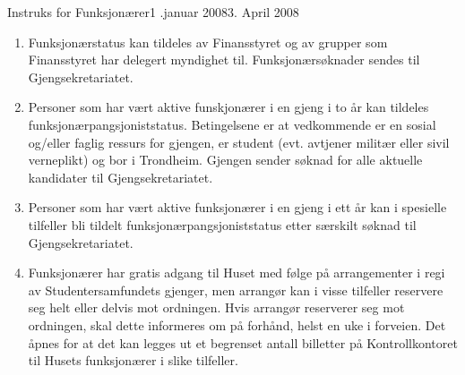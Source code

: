 \begin{instruks}{Instruks for Funksjonærer}{1 .januar 2008}{3. April 2008}

    \begin{enumerate}
        \item Funksjonærstatus kan tildeles av Finansstyret og av grupper som Finansstyret
            har delegert myndighet
            til. Funksjonærsøknader sendes til Gjengsekretariatet.
        \item Personer som har vært aktive funskjonærer i en gjeng i to år kan tildeles
            funksjonærpangsjoniststatus.
            Betingelsene er at vedkommende er en sosial og/eller faglig ressurs for
            gjengen, er student (evt. avtjener
            militær eller sivil verneplikt) og bor i Trondheim. Gjengen sender søknad for
            alle aktuelle kandidater til
            Gjengsekretariatet.
        \item Personer som har vært aktive funksjonærer i en gjeng i ett år kan i spesielle
            tilfeller bli tildelt
            funksjonærpangsjoniststatus etter særskilt søknad til Gjengsekretariatet.
        \item Funksjonærer har gratis adgang til Huset med følge på arrangementer i regi av
            Studentersamfundets
            gjenger, men arrangør kan i visse tilfeller reservere seg helt eller delvis
            mot ordningen. Hvis arrangør
            reserverer seg mot ordningen, skal dette informeres om på forhånd, helst en
            uke i forveien. Det åpnes
            for at det kan legges ut et begrenset antall billetter på Kontrollkontoret til
            Husets funksjonærer i slike
            tilfeller.
    \end{enumerate}

\end{instruks}


